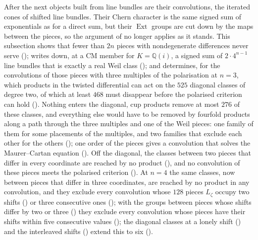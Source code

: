 \documentclass[11pt,reqno]{amsart}
\theoremstyle{plain}
\theoremstyle{definition}
\theoremstyle{remark}
\newcommand{\QQ}{\mathbb{Q}}
\DeclareMathOperator{\Ext}{Ext}
\begin{document}
After  the next objects built from line bundles are their
convolutions, the iterated cones of shifted line bundles. Their Chern
character is the same signed sum of exponentials as for a direct sum, but
their $\Ext$ groups are cut down by the maps between the pieces, so the
argument of \cite[Theorem~9.20]{paperI} no longer applies as it stands. This
subsection shows that fewer than $2n$ pieces with nondegenerate differences
never serve (); writes down, at a CM member for
$K=\QQ(i)$, a signed sum of $2\cdot4^{n-1}$ line bundles that is exactly a
real Weil class (); and determines, for the
convolutions of those pieces with three multiples of the polarisation at
$n=3$, which products in the twisted differential can act on the $525$
diagonal classes of degree two, of which at least $468$ must disappear
before the polarised criterion can hold (). Nothing
enters the diagonal, cup products remove at most $276$ of these classes, and
everything else would have to be removed by fourfold products along a path
through the three multiples and one of the Weil pieces: one family of them
for some placements of the multiples, and two families that exclude each
other for the others (); one order of the pieces
gives a convolution that solves the Maurer--Cartan equation
(). Off the diagonal, the classes between two
pieces that differ in every coordinate are reached by no product
(), and no
convolution of these pieces meets the polarised criterion
(). At $n=4$ the same classes, now between pieces
that differ in three coordinates, are reached by no product in any
convolution, and they exclude every convolution whose $128$ pieces
$L_{\zeta}$ occupy two shifts () or three
consecutive ones (); with the groups between
pieces whose shifts differ by two or three () they
exclude every convolution whose pieces have their shifts within five
consecutive values (); the diagonal classes at a lonely
shift () and the interleaved shifts
() extend this to six ().
\end{document}
